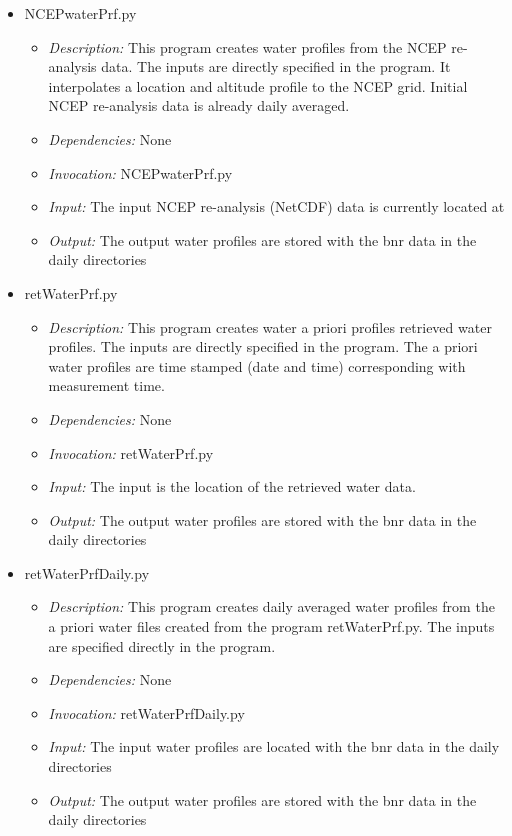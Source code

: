 \documentclass[12pt, letterpaper]{article}
\begin{document}
\begin{itemize}
\item NCEPwaterPrf.py
\begin{itemize}
\item \textit{Description:} This program creates water profiles from the NCEP re-analysis data. The inputs are directly specified in the program. It interpolates a location and altitude profile to the NCEP grid. Initial NCEP re-analysis data is already daily averaged.
\item \textit{Dependencies:} None
\item \textit{Invocation:} NCEPwaterPrf.py
\item \textit{Input:} The input NCEP re-analysis (NetCDF) data is currently located at 
\item \textit{Output:} The output water profiles are stored with the bnr data in the daily directories 
\end{itemize}
\end{itemize}

\begin{itemize}
\item retWaterPrf.py
\begin{itemize}
\item \textit{Description:} This program creates water a priori profiles retrieved water profiles. The inputs are directly specified in the program. The a priori water profiles are time stamped (date and time) corresponding with measurement time.
\item \textit{Dependencies:} None
\item \textit{Invocation:} retWaterPrf.py
\item \textit{Input:} The input is the location of the retrieved water data.
\item \textit{Output:} The output water profiles are stored with the bnr data in the daily directories 
\end{itemize}
\end{itemize}

\begin{itemize}
\item retWaterPrfDaily.py
\begin{itemize}
\item \textit{Description:} This program creates daily averaged water profiles from the a priori water files created from the program retWaterPrf.py. The inputs are specified directly in the program.
\item \textit{Dependencies:} None
\item \textit{Invocation:} retWaterPrfDaily.py
\item \textit{Input:} The input water profiles are located with the bnr data in the daily directories 
\item \textit{Output:} The output water profiles are stored with the bnr data in the daily directories 
\end{itemize}
\end{itemize}
\end{document}
